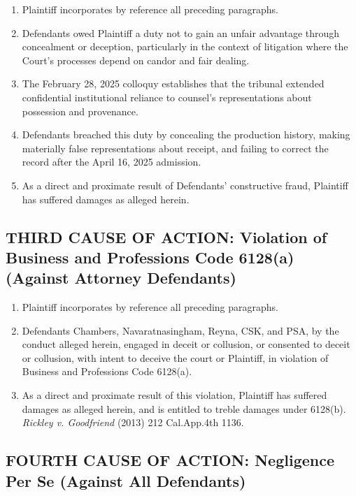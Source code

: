 \begin{enumerate}
\def\labelenumi{\arabic{enumi}.}
\setcounter{enumi}{55}
\item
  Plaintiff incorporates by reference all preceding paragraphs.
\item
  Defendants owed Plaintiff a duty not to gain an unfair advantage through concealment or deception, particularly in the context of litigation where the Court's processes depend on candor and fair dealing.
\item
  The February 28, 2025 colloquy establishes that the tribunal extended confidential institutional reliance to counsel's representations about possession and provenance.
\item
  Defendants breached this duty by concealing the production history, making materially false representations about receipt, and failing to correct the record after the April 16, 2025 admission.
\item
  As a direct and proximate result of Defendants' constructive fraud, Plaintiff has suffered damages as alleged herein.
\end{enumerate}

\subsection{THIRD CAUSE OF ACTION: Violation of Business and Professions Code \textsection{} 6128(a) (Against Attorney Defendants)}\label{third-cause-of-action-violation-of-business-and-professions-code-6128a-against-attorney-defendants}

\begin{enumerate}
\def\labelenumi{\arabic{enumi}.}
\setcounter{enumi}{60}
\item
  Plaintiff incorporates by reference all preceding paragraphs.
\item
  Defendants Chambers, Navaratnasingham, Reyna, CSK, and PSA, by the conduct alleged herein, engaged in deceit or collusion, or consented to deceit or collusion, with intent to deceive the court or Plaintiff, in violation of Business and Professions Code \textsection{} 6128(a).
\item
  As a direct and proximate result of this violation, Plaintiff has suffered damages as alleged herein, and is entitled to treble damages under \textsection{} 6128(b). \emph{Rickley v. Goodfriend} (2013) 212 Cal.App.4th 1136.
\end{enumerate}

\subsection{FOURTH CAUSE OF ACTION: Negligence Per Se (Against All Defendants)}\label{fourth-cause-of-action-negligence-per-se-against-all-defendants}

